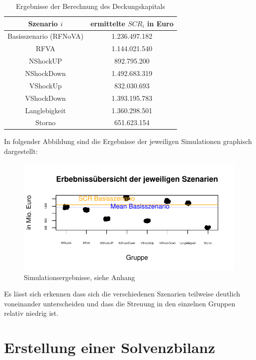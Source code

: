 \documentclass[parskip,12pt,paper=a4]{scrartcl}
\begin{document}
\begin{table}[h!]
  \centering
  \label{table1}
  \begin{tabular}{|c|c|}
	\hline
    	Szenario $i$ & ermittelte $SCR_i$ in Euro \\
    	\hline
    	Basisszenario (RFNoVA) & 1.236.497.182 \\        
	\hline
    	RFVA & 1.144.021.540 \\
	\hline
    	NShockUP & 892.795.200 \\
	\hline
    	NShockDown & 1.492.683.319    \\
	\hline
    	VShockUp &  832.030.693 \\
	\hline
    	VShockDown & 1.393.195.783 \\
	\hline
    	Langlebigkeit &  1.360.298.501\\
	\hline
    	Storno & 651.623.154 \\
	\hline
  \end{tabular}
\caption{Ergebnisse der Berechnung des Deckungskapitals}
\end{table}

In folgender Abbildung sind die Ergebnisse der jeweiligen Simulationen graphisch dargestellt:
\begin{figure}[h]
\centering
\includegraphics[scale=1.2]{Gesamtplot_1.pdf}
\caption{Simulationsergebnisse, siehe Anhang}
\end{figure}

Es lässt sich erkennen dass sich die verschiedenen Szenarien teilweise deutlich voneinander unterscheiden und dass die Streuung in den einzelnen Gruppen relativ niedrig ist.

\section{Erstellung einer Solvenzbilanz}
\end{document}
